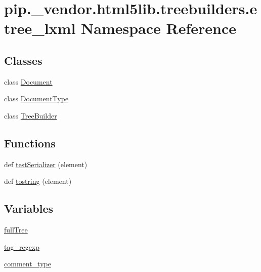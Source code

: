 \hypertarget{namespacepip_1_1__vendor_1_1html5lib_1_1treebuilders_1_1etree__lxml}{}\section{pip.\+\_\+vendor.\+html5lib.\+treebuilders.\+etree\+\_\+lxml Namespace Reference}
\label{namespacepip_1_1__vendor_1_1html5lib_1_1treebuilders_1_1etree__lxml}
\subsection*{Classes}
\begin{DoxyCompactItemize}
\item 
class \hyperlink{classpip_1_1__vendor_1_1html5lib_1_1treebuilders_1_1etree__lxml_1_1Document}{Document}
\item 
class \hyperlink{classpip_1_1__vendor_1_1html5lib_1_1treebuilders_1_1etree__lxml_1_1DocumentType}{Document\+Type}
\item 
class \hyperlink{classpip_1_1__vendor_1_1html5lib_1_1treebuilders_1_1etree__lxml_1_1TreeBuilder}{Tree\+Builder}
\end{DoxyCompactItemize}
\subsection*{Functions}
\begin{DoxyCompactItemize}
\item 
def \hyperlink{namespacepip_1_1__vendor_1_1html5lib_1_1treebuilders_1_1etree__lxml_aa7b80f9257214665ee9b57995e458cb2}{test\+Serializer} (element)
\item 
def \hyperlink{namespacepip_1_1__vendor_1_1html5lib_1_1treebuilders_1_1etree__lxml_af108ba67eca36b49a3d75e78d0d35be8}{tostring} (element)
\end{DoxyCompactItemize}
\subsection*{Variables}
\begin{DoxyCompactItemize}
\item 
\hyperlink{namespacepip_1_1__vendor_1_1html5lib_1_1treebuilders_1_1etree__lxml_aba667d4a2a267d7c030329d4182b5810}{full\+Tree}
\item 
\hyperlink{namespacepip_1_1__vendor_1_1html5lib_1_1treebuilders_1_1etree__lxml_ac56cb1903d366869ebbc73f2aeef1ebe}{tag\+\_\+regexp}
\item 
\hyperlink{namespacepip_1_1__vendor_1_1html5lib_1_1treebuilders_1_1etree__lxml_a8613b8362263a338310f8fcd95866c83}{comment\+\_\+type}
\end{DoxyCompactItemize}


